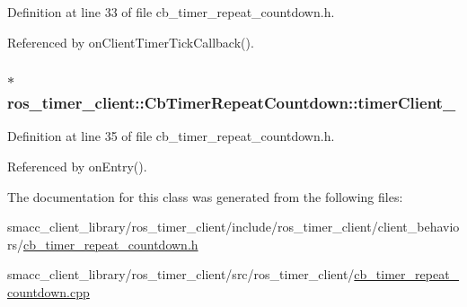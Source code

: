 Definition at line 33 of file cb\+\_\+timer\+\_\+repeat\+\_\+countdown.\+h.



Referenced by on\+Client\+Timer\+Tick\+Callback().

\subsubsection[{\texorpdfstring{timer\+Client\+\_\+}{timerClient_}}]{$\ast$ ros\+\_\+timer\+\_\+client\+::\+Cb\+Timer\+Repeat\+Countdown\+::timer\+Client\+\_\+\hspace{0.3cm}{\ttfamily [private]}}\hypertarget{classros__timer__client_1_1CbTimerRepeatCountdown_aa75e5963e7a1593d7f71ff821a5127b0}{}\label{classros__timer__client_1_1CbTimerRepeatCountdown_aa75e5963e7a1593d7f71ff821a5127b0}


Definition at line 35 of file cb\+\_\+timer\+\_\+repeat\+\_\+countdown.\+h.



Referenced by on\+Entry().



The documentation for this class was generated from the following files\+:\begin{DoxyCompactItemize}
\item 
smacc\+\_\+client\+\_\+library/ros\+\_\+timer\+\_\+client/include/ros\+\_\+timer\+\_\+client/client\+\_\+behaviors/\hyperlink{cb__timer__repeat__countdown_8h}{cb\+\_\+timer\+\_\+repeat\+\_\+countdown.\+h}\item 
smacc\+\_\+client\+\_\+library/ros\+\_\+timer\+\_\+client/src/ros\+\_\+timer\+\_\+client/\hyperlink{cb__timer__repeat__countdown_8cpp}{cb\+\_\+timer\+\_\+repeat\+\_\+countdown.\+cpp}\end{DoxyCompactItemize}
